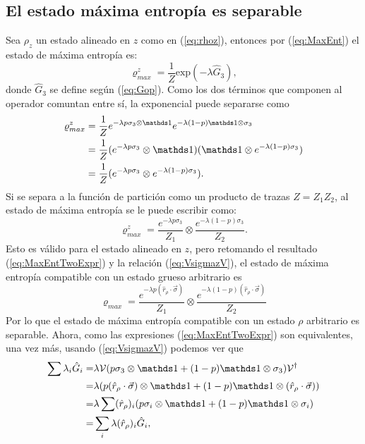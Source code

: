 \subsection{El estado máxima entropía es separable}

Sea $\rho_{z}$ un estado alineado en $z$ como en (\ref{eq:rhoz}), entonces por (\ref{eq:MaxEnt}) el estado de máxima entropía es:
\begin{equation}\label{eq:MaxEntUgly}
\varrho_{max}^{z}=\frac{1}{Z}\text{exp}(-\lambda\hat{G}_{3}),
\end{equation}
donde $\hat{G}_{3}$ se define según (\ref{eq:Gop}). Como los dos términos que componen al operador comuntan entre sí, la exponencial puede separarse como
\begin{align*}
\varrho_{max}^{z}&=\frac{1}{Z}e^{-\lambda p\sigma_{3}\otimes\Id}e^{-\lambda(1-p)\Id\otimes\sigma_{3}}\\
&=\frac{1}{Z}(e^{-\lambda p\sigma_{3}}\otimes\Id)( \Id\otimes e^{-\lambda(1-p)\sigma_{3}})\\
&=\frac{1}{Z}(e^{-\lambda p\sigma_{3}}\otimes e^{-\lambda(1-p)\sigma_{3}}).\\
\end{align*}
Si se separa a la función de partición como un producto de trazas $Z=Z_{1}Z_{2}$, al estado de máxima entropía se le puede escribir como:
\begin{equation}\label{eq:MaxEntZ}
\varrho_{max}^{z}=\frac{e^{-\lambda p\sigma_{3}}}{Z_{1}} \otimes \frac{e^{-\lambda(1-p)\sigma_{3}}}{Z_{2}}.
\end{equation}
Esto es válido para el estado alineado en $z$, pero retomando el resultado (\ref{eq:MaxEntTwoExpr}) y la relación (\ref{eq:VsigmazV}), el estado de máxima entropía compatible con un estado grueso arbitrario es
\begin{equation}\label{eq:MaxEntSeparable}
  \varrho_{max}=\frac{e^{-\lambda p(\hat{r}_{\rho}\cdot\vec{\sigma})}}{Z_{1}} \otimes \frac{e^{-\lambda(1-p)(\hat{r}_{\rho}\cdot\vec{\sigma})}}{Z_{2}}
\end{equation}
Por lo que el estado de máxima entropía compatible con un estado $\rho$ arbitrario es separable. Ahora, como las expresiones (\ref{eq:MaxEntTwoExpr}) son equivalentes, una vez más, usando (\ref{eq:VsigmazV}) podemos ver que
\begin{align*}
  \sum\lambda_{i}\hat{G}_{i}=&\lambda\mcV(p\sigma_{3}\otimes\Id+(1-p)\Id\otimes\sigma_{3})\mcV^{\dag}\\
  =&\lambda(p(\hat{r}_{\rho}\cdot\vec{\sigma})\otimes\Id+(1-p)\Id\otimes(\hat{r}_{\rho}\cdot\vec{\sigma}))\\
  =& \lambda\sum(\hat{r}_{\rho})_{i}(p\sigma_{i}\otimes\Id+(1-p)\Id\otimes\sigma_{i})\\
  =&\sum_{i}\lambda(\hat{r}_{\rho})_{i}\hat{G}_{i},
\end{align*}

